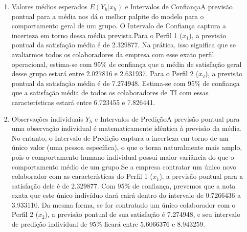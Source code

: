 \documentclass[
  letterpaper,
  DIV=11,
  numbers=noendperiod]{scrartcl}
\begin{document}
\begin{enumerate}
\def\labelenumi{(\alph{enumi})}
\item
  Valores médios esperados \(E(Y_h|x_h)\) e Intervalos de ConfiançaA
  previsão pontual para a média nos dá o melhor palpite do modelo para o
  comportamento geral de um grupo. O Intervalo de Confiança captura a
  incerteza em torno dessa média prevista.Para o Perfil 1 (\(x_1\)), a
  previsão pontual da satisfação média é de 2.329877. Na prática, isso
  significa que se avaliarmos todos os colaboradores da empresa com esse
  exato perfil operacional, estima-se com 95\% de confiança que a média
  de satisfação geral desse grupo estará entre 2.027816 e 2.631937. Para
  o Perfil 2 (\(x_2\)), a previsão pontual da satisfação média é de
  7.274948. Estima-se com 95\% de confiança que a satisfação média de
  todos os colaboradores de TI com essas características estará entre
  6.723455 e 7.826441.
\item
  Observações individuais \(Y_h\) e Intervalos de PrediçãoA previsão
  pontual para uma observação individual é matematicamente idêntica à
  previsão da média. No entanto, o Intervalo de Predição captura a
  incerteza em torno de um único valor (uma pessoa específica), o que o
  torna naturalmente mais amplo, pois o comportamento humano individual
  possui maior variância do que o comportamento médio de um grupo.Se a
  empresa contratar um único novo colaborador com as características do
  Perfil 1 (\(x_1\)), a previsão pontual para a satisfação dele é de
  2.329877. Com 95\% de confiança, prevemos que a nota exata que este
  único indivíduo dará cairá dentro do intervalo de 0.7266436 a
  3.933110. Da mesma forma, se for contratado um único colaborador com o
  Perfil 2 (\(x_2\)), a previsão pontual de sua satisfação é 7.274948, e
  seu intervalo de predição individual de 95\% ficará entre 5.6066376 e
  8.943259.
\end{enumerate}
\end{document}
